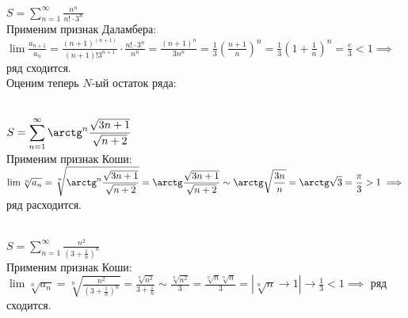     \begin{problem}
        \ \\
        $\displaystyle
        S = \sum\limits_{n=1}^{\infty}\frac{n^n}{n!\cdot3^n}$\\[3pt]
        Применим признак Даламбера:\\[3pt]
        $\displaystyle\lim\frac{a_{n + 1}}{a_n} = \frac{(n+1)^{(n+1)}}{(n+1)!3^{n+1}} \cdot \frac{n!\cdot3^n}{n^n} = \frac{(n+1)^{n}}{3n^n} =
        \frac{1}{3}\left(\frac{n + 1}{n}\right)^n =\frac{1}{3}\left(1+\frac{1}{n}\right)^n = \frac{e}{3} < 1 \implies
        $ ряд сходится.\\[3pt]
        Оценим теперь $N$-ый остаток ряда:\\[3pt]
    \end{problem}
    \begin{problem}
        \ \\
        $\displaystyle
        S = \sum\limits_{n=1}^{\infty}\arctg^n\frac{\sqrt{3n+1}}{\sqrt{n+2}}$\\[3pt]
        Применим признак Коши:\\[3pt]
        $\displaystyle\lim\sqrt[n]{a_n} = \sqrt[n]{\arctg^n\frac{\sqrt{3n+1}}{\sqrt{n+2}}} =
        \arctg\frac{\sqrt{3n+1}}{\sqrt{n+2}} \sim\arctg\sqrt{\frac{3n}{n}} =
        \arctg\sqrt{3}=\frac{\pi}{3} > 1 \implies
        $ ряд расходится.
    \end{problem}
    \begin{problem}
        \ \\
        $\displaystyle
        S = \sum\limits_{n=1}^{\infty}\frac{n^2}{\left(3+\frac{1}{n}\right)^n}$\\[3pt]
        Применим признак Коши:\\[3pt]
        $\displaystyle\lim\sqrt[n]{a_n} = \sqrt[n]{\frac{n^2}{\left(3+\frac{1}{n}\right)^n}} = \frac{\sqrt[n]{n^2}}{3 + \frac{1}{n}} \sim\frac{\sqrt[n]{n^2}}{3} =\frac{\sqrt[n]{n}\sqrt[n]{n}}{3} =
        \left|\sqrt[n]{n}\to 1\right| \to \frac{1}{3} < 1 \implies
        $ ряд сходится.
    \end{problem}
